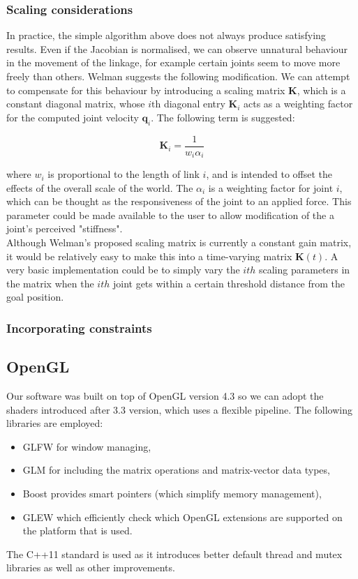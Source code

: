 \documentclass[paper=a4, fontsize=11pt]{scrartcl} %
\numberwithin{equation}{section} %
\numberwithin{figure}{section} %
\numberwithin{table}{section} %
\newcommand{\vect}[1]{\mathbf{#1}}
\begin{document}
\subsubsection{Scaling considerations}

In practice, the simple algorithm above does not always produce satisfying results. Even if the Jacobian is normalised, we can observe unnatural behaviour in the movement of the linkage, for example certain joints seem to move more freely than others. Welman suggests the following modification. We can attempt to compensate for this behaviour by introducing a scaling matrix $\vect{K}$, which is a constant diagonal matrix, whose $i \text{th}$ diagonal entry $\vect{K}_i$ acts as a weighting factor for the computed joint velocity $\vect{q}_i$. The following term is suggested:

\begin{equation}
\vect{K}_i = \frac{1}{w_i \alpha_i}
\end{equation}

where $w_i$ is proportional to the length of link $i$, and is intended to offset the effects of the overall scale of the world. The $\alpha_i$ is a weighting factor for joint $i$, which can be thought as the responsiveness of the joint to an applied force. This parameter could be made available to the user to allow modification of the a joint's perceived "stiffness". \\

Although Welman's proposed scaling matrix is currently a constant gain matrix, it would be relatively easy to make this into a time-varying matrix $\vect{K}(t)$. A very basic implementation could be to simply vary the $ith$ scaling parameters in the matrix when the $ith$ joint gets within a certain threshold distance from the goal position.

\subsubsection{Incorporating constraints}

\subsection{ OpenGL}

% 
Our software was built on top of OpenGL version 4.3 so we can adopt the shaders introduced after 3.3 version, which uses a flexible pipeline. The following libraries are employed: 
\begin{itemize}
\item GLFW for window managing, 
\item GLM  for including the matrix operations and matrix-vector data types, 
\item Boost provides smart pointers (which simplify memory management), 
\item GLEW which efficiently check which OpenGL extensions are supported on the platform that is used. 
\end{itemize}
The C++11 standard is used as it introduces better default thread and mutex libraries as well as other improvements. \\
\end{document}

